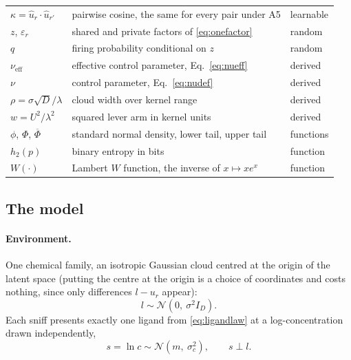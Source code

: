 \documentclass[11pt,a4paper]{article}
\newcommand{\Phibar}{\overline{\Phi}}
\newcommand{\htwo}{h_2}
\newcommand{\uhat}{\hat{u}}
\newcommand{\nueff}{\nu_{\mathrm{eff}}}
\begin{document}
\begin{center}
\begin{tabular}{lll}
$\kappa = \uhat_r\cdot\uhat_{r'}$ & pairwise cosine, the same for every pair under A5 & learnable \\
$z$, $\varepsilon_r$ & shared and private factors of \eqref{eq:onefactor} & random \\
$q$ & firing probability conditional on $z$ & random \\
$\nueff$ & effective control parameter, Eq.~\eqref{eq:nueff} & derived \\
$\nu$ & control parameter, Eq.~\eqref{eq:nudef} & derived \\
$\rho = \sigma\sqrt{D}/\lambda$ & cloud width over kernel range & derived \\
$w = U^2/\lambda^2$ & squared lever arm in kernel units & derived \\
$\phi$, $\Phi$, $\Phibar$ & standard normal density, lower tail, upper tail & functions \\
$\htwo(p)$ & binary entropy in bits & function \\
$W(\cdot)$ & Lambert $W$ function, the inverse of $x \mapsto xe^x$ & function \\
\bottomrule
\end{tabular}
\end{center}

\subsection{The model}

\paragraph{Environment.} One chemical family, an isotropic Gaussian cloud centred at the
origin of the latent space (putting the centre at the origin is a choice of coordinates
and costs nothing, since only differences $l - u_r$ appear):
\begin{equation}
  l \sim \mathcal{N}(0,\ \sigma^2 I_D).
  \label{eq:ligandlaw}
\end{equation}
Each sniff presents exactly one ligand from \eqref{eq:ligandlaw} at a log-concentration
drawn independently,
\begin{equation}
  s = \ln c \sim \mathcal{N}(m,\ \sigma_c^2),
  \qquad s \perp l .
  \label{eq:conclaw}
\end{equation}
\end{document}
